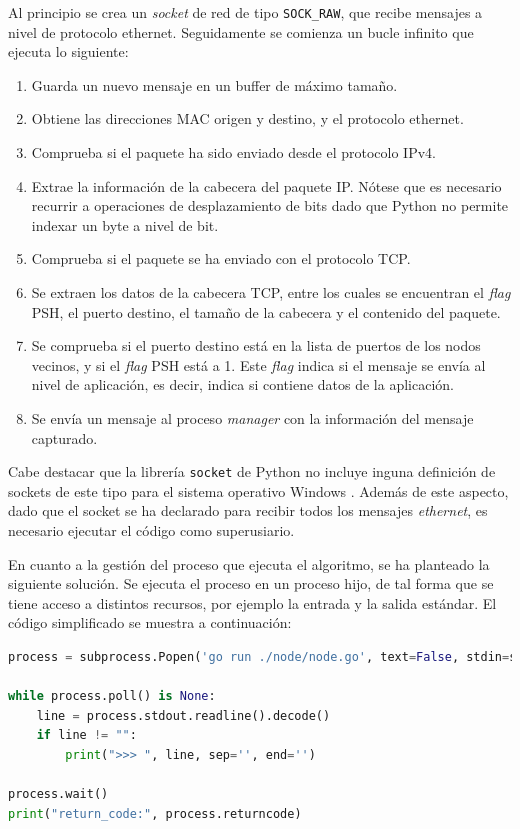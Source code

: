 Al principio se crea un \textit{socket} de red de tipo \texttt{SOCK\_RAW}, que recibe mensajes a nivel de protocolo ethernet. Seguidamente se comienza un bucle infinito que ejecuta lo siguiente:

\begin{enumerate}
\item Guarda un nuevo mensaje en un buffer de máximo tamaño.
\item Obtiene las direcciones MAC origen y destino, y el protocolo ethernet.
\item Comprueba si el paquete ha sido enviado desde el protocolo IPv4.
\item Extrae la información de la cabecera del paquete IP. Nótese que es necesario recurrir a operaciones de desplazamiento de bits dado que Python no permite indexar un byte a nivel de bit.
\item Comprueba si el paquete se ha enviado con el protocolo TCP.
\item Se extraen los datos de la cabecera TCP, entre los cuales se encuentran el \textit{flag} PSH, el puerto destino, el tamaño de la cabecera y el contenido del paquete.
\item Se comprueba si el puerto destino está en la lista de puertos de los nodos vecinos, y si el \textit{flag} PSH está a 1. Este \textit{flag} indica si el mensaje se envía al nivel de aplicación, es decir, indica si contiene datos de la aplicación.
\item Se envía un mensaje al proceso \textit{manager} con la información del mensaje capturado.
\end{enumerate}

Cabe destacar que la librería \texttt{socket} de Python no incluye inguna definición de sockets de este tipo para el sistema operativo Windows \cite{pythonsocket}. Además de este aspecto, dado que el socket se ha declarado para recibir todos los mensajes \textit{ethernet}, es necesario ejecutar el código como superusiario.

En cuanto a la gestión del proceso que ejecuta el algoritmo, se ha planteado la siguiente solución. Se ejecuta el proceso en un proceso hijo, de tal forma que se tiene acceso a distintos recursos, por ejemplo la entrada y la salida estándar. El código simplificado se muestra a continuación:

\begin{lstlisting}[language=Python]
process = subprocess.Popen('go run ./node/node.go', text=False, stdin=subprocess.PIPE, stdout=subprocess.PIPE, stderr=subprocess.PIPE, universal_newlines=False, shell=True)

while process.poll() is None:
    line = process.stdout.readline().decode()
    if line != "":
        print(">>> ", line, sep='', end='')

process.wait()
print("return_code:", process.returncode)
\end{lstlisting}

